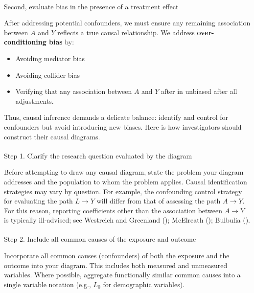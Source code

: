 \documentclass[
  single column]{article}
\makeatletter
\let\oldparagraph\paragraph
\renewcommand{\paragraph}{
    \@ifstar
      \xxxParagraphStar
      \xxxParagraphNoStar
  }
\newcommand{\xxxParagraphStar}[1]{\oldparagraph*{#1}\mbox{}}
\newcommand{\xxxParagraphNoStar}[1]{\oldparagraph{#1}\mbox{}}
\providecommand{\tightlist}{%
  \setlength{\itemsep}{0pt}\setlength{\parskip}{0pt}}\usepackage{longtable,booktabs,array}
\makeatother
\begin{document}
\paragraph{Second, evaluate bias in the presence of a treatment
effect}\label{second-evaluate-bias-in-the-presence-of-a-treatment-effect}

After addressing potential confounders, we must ensure any remaining
association between \(A\) and \(Y\) reflects a true causal relationship.
We address \textbf{over-conditioning bias} by:

\begin{itemize}
\tightlist
\item
  Avoiding mediator bias
\item
  Avoiding collider bias
\item
  Verifying that any association between \(A\) and \(Y\) after in
  unbiased after all adjustments.
\end{itemize}

Thus, causal inference demands a delicate balance: identify and control
for confounders but avoid introducing new biases. Here is how
investigators should construct their causal diagrams.

\paragraph{Step 1. Clarify the research question evaluated by the
diagram}\label{step-1.-clarify-the-research-question-evaluated-by-the-diagram}

Before attempting to draw any causal diagram, state the problem your
diagram addresses and the population to whom the problem applies. Causal
identification strategies may vary by question. For example, the
confounding control strategy for evaluating the path \(L\to Y\) will
differ from that of assessing the path \(A\to Y\). For this reason,
reporting coefficients other than the association between \(A \to Y\) is
typically ill-advised; see Westreich and Greenland
(); McElreath
(); Bulbulia
().

\paragraph{Step 2. Include all common causes of the exposure and
outcome}\label{step-2.-include-all-common-causes-of-the-exposure-and-outcome}

Incorporate all common causes (confounders) of both the exposure and the
outcome into your diagram. This includes both measured and unmeasured
variables. Where possible, aggregate functionally similar common causes
into a single variable notation (e.g., \(L_0\) for demographic
variables).
\end{document}
